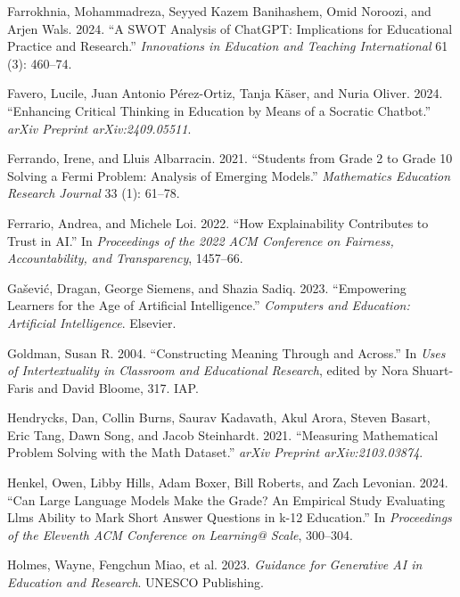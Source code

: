 \documentclass[
  11pt,
]{article}
\newlength{\cslhangindent}
\newenvironment{CSLReferences}[2] %
 {\begin{list}{}{%
  \setlength{\itemindent}{0pt}
  \setlength{\leftmargin}{0pt}
  \setlength{\parsep}{0pt}
  \ifodd #1
   \setlength{\leftmargin}{\cslhangindent}
   \setlength{\itemindent}{-1\cslhangindent}
  \fi
  \setlength{\itemsep}{#2\baselineskip}}}
 {\end{list}}
\begin{document}
\begin{CSLReferences}{1}{0}
Farrokhnia, Mohammadreza, Seyyed Kazem Banihashem, Omid Noroozi, and Arjen Wals. 2024. {``A SWOT Analysis of ChatGPT: Implications for Educational Practice and Research.''} \emph{Innovations in Education and Teaching International} 61 (3): 460--74.

Favero, Lucile, Juan Antonio Pérez-Ortiz, Tanja Käser, and Nuria Oliver. 2024. {``Enhancing Critical Thinking in Education by Means of a Socratic Chatbot.''} \emph{arXiv Preprint arXiv:2409.05511}.

Ferrando, Irene, and Lluis Albarracin. 2021. {``Students from Grade 2 to Grade 10 Solving a Fermi Problem: Analysis of Emerging Models.''} \emph{Mathematics Education Research Journal} 33 (1): 61--78.

Ferrario, Andrea, and Michele Loi. 2022. {``How Explainability Contributes to Trust in AI.''} In \emph{Proceedings of the 2022 ACM Conference on Fairness, Accountability, and Transparency}, 1457--66.

Gašević, Dragan, George Siemens, and Shazia Sadiq. 2023. {``Empowering Learners for the Age of Artificial Intelligence.''} \emph{Computers and Education: Artificial Intelligence}. Elsevier.

Goldman, Susan R. 2004. {``Constructing Meaning Through and Across.''} In \emph{Uses of Intertextuality in Classroom and Educational Research}, edited by Nora Shuart-Faris and David Bloome, 317. IAP.

Hendrycks, Dan, Collin Burns, Saurav Kadavath, Akul Arora, Steven Basart, Eric Tang, Dawn Song, and Jacob Steinhardt. 2021. {``Measuring Mathematical Problem Solving with the Math Dataset.''} \emph{arXiv Preprint arXiv:2103.03874}.

Henkel, Owen, Libby Hills, Adam Boxer, Bill Roberts, and Zach Levonian. 2024. {``Can Large Language Models Make the Grade? An Empirical Study Evaluating Llms Ability to Mark Short Answer Questions in k-12 Education.''} In \emph{Proceedings of the Eleventh ACM Conference on Learning@ Scale}, 300--304.

Holmes, Wayne, Fengchun Miao, et al. 2023. \emph{Guidance for Generative AI in Education and Research}. UNESCO Publishing.


\end{CSLReferences}
\end{document}
